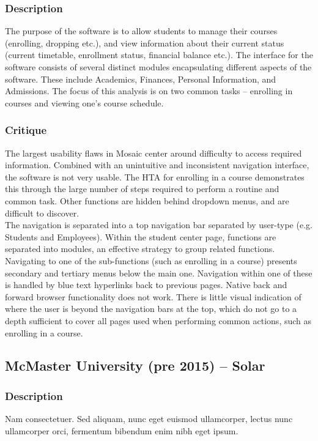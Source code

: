\documentclass[10pt]{article}
\begin{document}
\begin{multicols}{2}
\subsubsection*{Description}
The purpose of the software is to allow students to manage their courses (enrolling, dropping etc.), and view information about their current status (current timetable, enrollment status, financial balance etc.). The interface for the software consists of several distinct modules encapsulating different aspects of the software. These include Academics, Finances, Personal Information, and Admissions. The focus of this analysis is on two common tasks -- enrolling in courses and viewing one's course schedule.

\subsubsection*{Critique}
The largest usability flaws in Mosaic center around difficulty to access required information. Combined with an unintuitive and inconsistent navigation interface, the software is not very usable. The HTA for enrolling in a course demonstrates this through the large number of steps required to perform a routine and common task. Other functions are hidden behind dropdown menus, and are difficult to discover.\\

The navigation is separated into a top navigation bar separated by user-type (e.g. Students and Employees). Within the student center page, functions are separated into modules, an effective strategy to group related functions. Navigating to one of the sub-functions (such as enrolling in a course) presents secondary and tertiary menus below the main one. Navigation within one of these is handled by blue text hyperlinks back to previous pages. Native back and forward browser functionality does not work. There is little visual indication of where the user is beyond the navigation bars at the top, which do not go to a depth sufficient to cover all pages used when performing common actions, such as enrolling in a course.

\subsection*{McMaster University (pre 2015) -- Solar}
\subsubsection*{Description}
Nam consectetuer. Sed aliquam, nunc eget euismod ullamcorper, lectus nunc ullamcorper orci, fermentum bibendum enim nibh eget ipsum.


\end{multicols}
\end{document}
